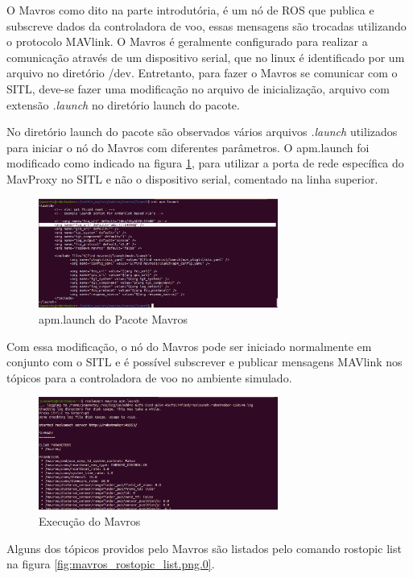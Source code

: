 \documentclass[12pt,a4paper,oneside]{book}
\begin{document}
O Mavros como dito na parte introdutória, é um nó de ROS que publica e subscreve dados da controladora de voo, essas mensagens são trocadas utilizando o protocolo MAVlink. O Mavros é geralmente configurado para realizar a comunicação através de um dispositivo serial, que no linux é identificado por um arquivo no diretório /dev. Entretanto, para fazer o Mavros se comunicar com o SITL, deve-se fazer uma modificação no arquivo de inicialização, arquivo com extensão \textit{.launch} no diretório launch do pacote.

No diretório launch do pacote são observados vários arquivos \textit{.launch} utilizados para iniciar o nó do Mavros com diferentes parâmetros. O apm.launch foi modificado como indicado na figura \ref{fig:mavros_launch.png.0}, para utilizar a porta de rede específica do MavProxy no SITL e não o dispositivo serial, comentado na linha superior.
%
\begin{figure}[H]
  \centering
  \includegraphics[width=0.7\textwidth]{Images/Desenvolvimento/mavros_launch.png}
  \caption{apm.launch do Pacote Mavros}
  \label{fig:mavros_launch.png.0}
\end{figure}
%
Com essa modificação, o nó do Mavros pode ser iniciado normalmente em conjunto com o SITL e é possível subscrever e publicar mensagens MAVlink nos tópicos para a controladora de voo no ambiente simulado. 
%
\begin{figure}[H]
  \centering
  \includegraphics[width=0.7\textwidth]{Images/Desenvolvimento/mavros_execution.png}
  \caption{Execução do Mavros}
  \label{fig:mavros_execution.png.0}
\end{figure}
%
Alguns dos tópicos providos pelo Mavros são listados pelo comando rostopic list na figura \ref{fig:mavros_rostopic_list.png.0}. 
\end{document}
